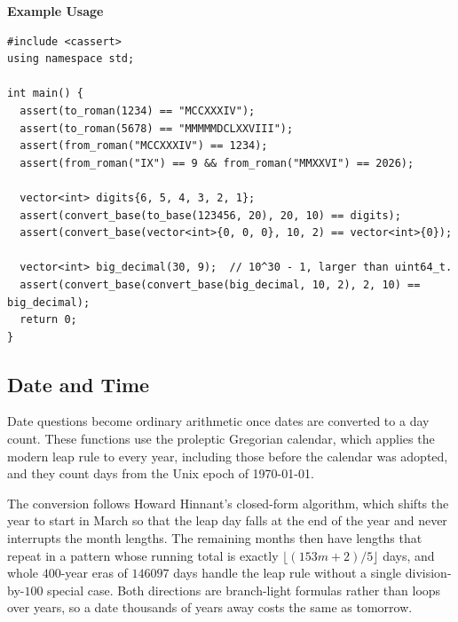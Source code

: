 \textbf{Example Usage}\par
\begin{lstlisting}[style=cpp]
#include <cassert>
using namespace std;

int main() {
  assert(to_roman(1234) == "MCCXXXIV");
  assert(to_roman(5678) == "MMMMMDCLXXVIII");
  assert(from_roman("MCCXXXIV") == 1234);
  assert(from_roman("IX") == 9 && from_roman("MMXXVI") == 2026);

  vector<int> digits{6, 5, 4, 3, 2, 1};
  assert(convert_base(to_base(123456, 20), 20, 10) == digits);
  assert(convert_base(vector<int>{0, 0, 0}, 10, 2) == vector<int>{0});

  vector<int> big_decimal(30, 9);  // 10^30 - 1, larger than uint64_t.
  assert(convert_base(convert_base(big_decimal, 10, 2), 2, 10) == big_decimal);
  return 0;
}
\end{lstlisting}
\subsection{Date and Time}
\label{sec:6.1.4}
Date questions become ordinary arithmetic once dates are converted to a day count. These functions use the proleptic Gregorian calendar, which applies the modern leap rule to every year, including those before the calendar was adopted, and they count days from the Unix epoch of 1970-01-01.

The conversion follows Howard Hinnant's closed-form algorithm, which shifts the year to start in March so that the leap day falls at the end of the year and never interrupts the month lengths. The remaining months then have lengths that repeat in a pattern whose running total is exactly $\lfloor (153m + 2)/5 \rfloor$ days, and whole $400$-year eras of $146097$ days handle the leap rule without a single division-by-$100$ special case. Both directions are branch-light formulas rather than loops over years, so a date thousands of years away costs the same as tomorrow.

